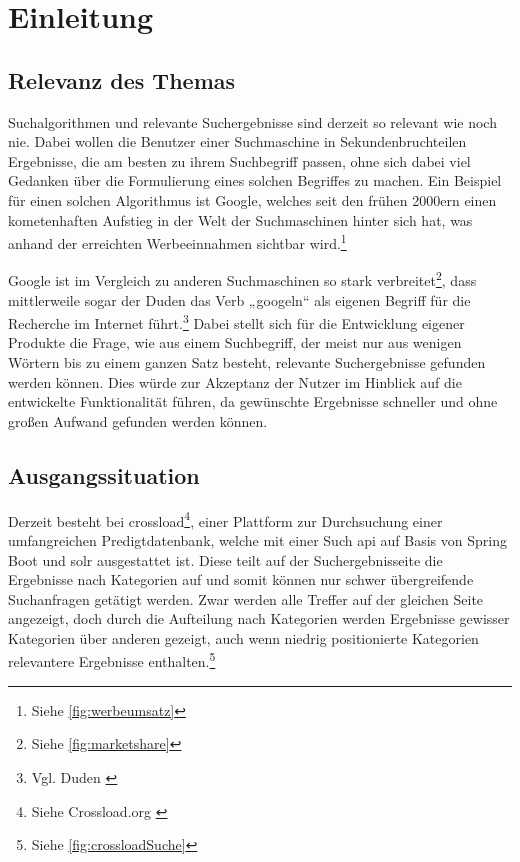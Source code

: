 \chapter{Einleitung}\label{ch:intro}

\section{Relevanz des Themas}
Suchalgorithmen und relevante Suchergebnisse sind derzeit so relevant wie noch nie.
Dabei wollen die Benutzer einer Suchmaschine in Sekundenbruchteilen Ergebnisse, die am besten zu ihrem Suchbegriff passen, ohne sich dabei viel Gedanken über die Formulierung eines solchen Begriffes zu machen.
Ein Beispiel für einen solchen Algorithmus ist Google, welches seit den frühen 2000ern einen kometenhaften Aufstieg in der Welt der Suchmaschinen hinter sich hat, was anhand der erreichten Werbeeinnahmen sichtbar wird.\footnote{Siehe \ref{fig:werbeumsatz}}

Google ist im Vergleich zu anderen Suchmaschinen so stark verbreitet\footnote{Siehe \ref{fig:marketshare}}, dass mittlerweile sogar der Duden das Verb „googeln“ als eigenen Begriff für die Recherche im Internet führt.\footnote{Vgl. Duden \cite{duden2022}}
Dabei stellt sich für die Entwicklung eigener Produkte die Frage, wie aus einem Suchbegriff, der meist nur aus wenigen Wörtern bis zu einem ganzen Satz besteht, relevante Suchergebnisse gefunden werden können. Dies würde zur Akzeptanz der Nutzer im Hinblick auf die entwickelte Funktionalität führen, da gewünschte Ergebnisse schneller und ohne großen Aufwand gefunden werden können.

\section{Ausgangssituation}
Derzeit besteht bei \gls{crossload}\footnote{Siehe Crossload.org \cite{pfleiderer2022}}, einer Plattform zur Durchsuchung einer umfangreichen Predigtdatenbank, welche mit einer Such \gls{api} auf Basis von Spring Boot und \gls{solr} ausgestattet ist. Diese teilt auf der Suchergebnisseite die Ergebnisse nach Kategorien auf und somit können nur schwer übergreifende Suchanfragen getätigt werden. Zwar werden alle Treffer auf der gleichen Seite angezeigt, doch durch die Aufteilung nach Kategorien werden Ergebnisse gewisser Kategorien über anderen gezeigt, auch wenn niedrig positionierte Kategorien relevantere Ergebnisse enthalten.\footnote{Siehe \ref{fig:crossloadSuche}}

